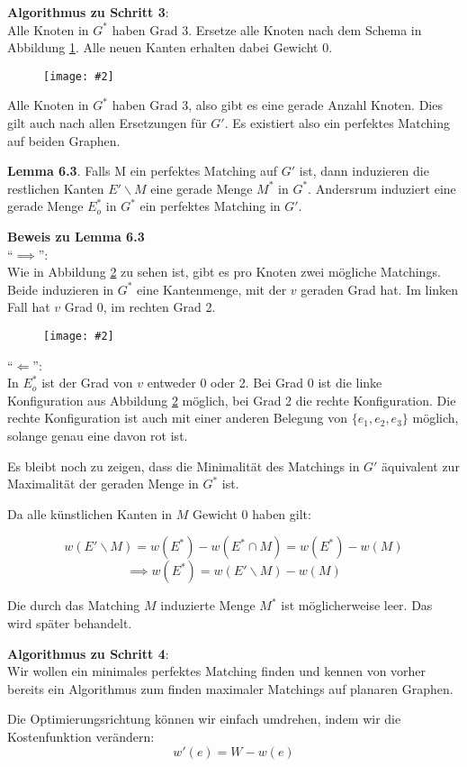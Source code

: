 \documentclass[10pt,a4paper]{article}
\makeatletter
\def\maxwidth#1{\ifdim\Gin@nat@width>#1 #1\else\Gin@nat@width\fi}
\newcommand{\imageFigure}[4]{%
    \begin{figure}[h]%
        \centering%
        {%
            \setlength{\fboxsep}{1pt}%
            \setlength{\fboxrule}{1pt}%
            \texttt{[image: \#2]}%
        }%
        \caption{#1}%
        \label{fig:#4}%
    \end{figure}%
}
\makeatother
\begin{document}
\textbf{Algorithmus zu Schritt 3}:\\
Alle Knoten in $G^*$ haben Grad 3.
Ersetze alle Knoten nach dem Schema in Abbildung \ref{fig:shih1}.
Alle neuen Kanten erhalten dabei Gewicht 0.

\imageFigure{}{shih1.png}{.6}{shih1}

Alle Knoten in $G^*$ haben Grad 3, also gibt es eine gerade Anzahl Knoten.
Dies gilt auch nach allen Ersetzungen für $G'$.
Es existiert also ein perfektes Matching auf beiden Graphen.

\textbf{Lemma 6.3}. Falls M ein perfektes Matching auf $G'$ ist, dann
induzieren die restlichen Kanten $E'\backslash M$ eine gerade Menge $M^*$ in
$G^*$.
Andersrum induziert eine gerade Menge $E^*_o$ in $G^*$ ein perfektes Matching
in $G'$.

\textbf{Beweis zu Lemma 6.3}\\
\enquote{$\implies$}:\\
Wie in Abbildung \ref{fig:shih2} zu sehen ist, gibt es pro Knoten zwei mögliche
Matchings.
Beide induzieren in $G^*$ eine Kantenmenge, mit der $v$ geraden Grad hat.
Im linken Fall hat $v$ Grad 0, im rechten Grad 2.

\imageFigure{}{shih2.png}{.7}{shih2}

\enquote{$\Longleftarrow$}:\\
In $E^*_o$ ist der Grad von $v$ entweder 0 oder 2.
Bei Grad 0 ist die linke Konfiguration aus Abbildung \ref{fig:shih2} möglich,
bei Grad 2 die rechte Konfiguration.
Die rechte Konfiguration ist auch mit einer anderen Belegung von $\{e_1, e_2,
e_3\}$ möglich, solange genau eine davon rot ist.

Es bleibt noch zu zeigen, dass die Minimalität des Matchings in $G'$ äquivalent
zur Maximalität der geraden Menge in $G^*$ ist.

Da alle künstlichen Kanten in $M$ Gewicht 0 haben gilt:

$$ w(E'\backslash M) = w(E^*) - w(E^* \cap M) = w(E^*) - w(M) $$
$$ \implies w(E^*) = w(E'\backslash M) - w(M) $$

Die durch das Matching $M$ induzierte Menge $M^*$ ist möglicherweise leer.
Das wird später behandelt.

\textbf{Algorithmus zu Schritt 4}:\\
Wir wollen ein minimales perfektes Matching finden und kennen von vorher
bereits ein Algorithmus zum finden maximaler Matchings auf planaren Graphen.

Die Optimierungsrichtung können wir einfach umdrehen, indem wir die
Kostenfunktion verändern:
$$ w'(e) = W - w(e) $$
\end{document}
